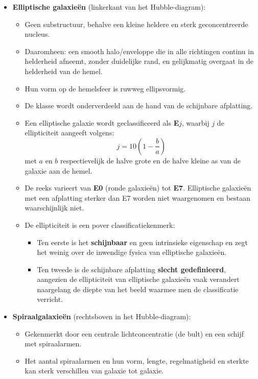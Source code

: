 \documentclass[10pt,a4paper]{article}
\renewenvironment{equation}{\begin{equation*}}{\end{equation*}}
\begin{document}
\begin{itemize}
  \item \textbf{Elliptische galaxieën} (linkerkant van het Hubble-diagram):
  \begin{itemize}
    \item Geen substructuur, behalve een kleine heldere en sterk geconcentreerde nucleus.
    \item Daaromheen: een smooth halo/enveloppe die in alle richtingen continu in helderheid afneemt, zonder duidelijke rand, en gelijkmatig overgaat in de helderheid van de hemel.
    \item Hun vorm op de hemelsfeer is ruwweg ellipsvormig.
    \item De klasse wordt onderverdeeld aan de hand van de schijnbare afplatting.
    \item Een elliptische galaxie wordt geclassificeerd als \textbf{E$j$}, waarbij $j$ de ellipticiteit aangeeft volgens:
    \begin{equation}
      j = 10\left(1-\frac{b}{a}\right)
      \tag{2.12}
    \end{equation}
    met $a$ en $b$ respectievelijk de halve grote en de halve kleine as van de galaxie aan de hemel.
    \item De reeks varieert van \textbf{E0} (ronde galaxieën) tot \textbf{E7}. Elliptische galaxieën met een afplatting sterker dan E7 worden niet waargenomen en bestaan waarschijnlijk niet.
    \item De ellipticiteit is een pover classificatiekenmerk:
    \begin{itemize}
      \item Ten eerste is het \textbf{schijnbaar} en geen intrinsieke eigenschap en zegt het weinig over de inwendige fysica van elliptische galaxieën.
      \item Ten tweede is de schijnbare afplatting \textbf{slecht gedefinieerd}, aangezien de ellipticiteit van elliptische galaxieën vaak verandert naargelang de diepte van het beeld waarmee men de classificatie verricht.
    \end{itemize}
  \end{itemize}

  \item \textbf{Spiraalgalaxieën} (rechtsboven in het Hubble-diagram):
  \begin{itemize}
    \item Gekenmerkt door een centrale lichtconcentratie (de bult) en een schijf met spiraalarmen.
    \item Het aantal spiraalarmen en hun vorm, lengte, regelmatigheid en sterkte kan sterk verschillen van galaxie tot galaxie.
  \end{itemize}


\end{itemize}
\end{document}
